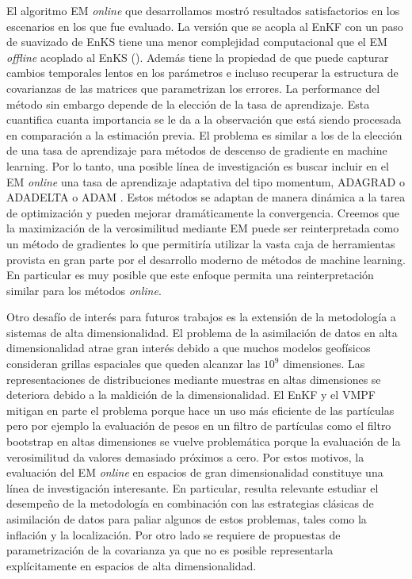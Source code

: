 El algoritmo EM \textit{online} que desarrollamos mostró resultados satisfactorios en los escenarios en los que fue evaluado. La versión que se acopla al EnKF con un paso de suavizado de EnKS tiene una menor complejidad computacional que el EM \textit{offline} acoplado al EnKS (\cite{Pulido2018}). Además tiene la propiedad de que puede capturar cambios temporales lentos en los parámetros e incluso recuperar la estructura de covarianzas de las matrices que parametrizan los errores. La performance del método sin embargo depende de la elección de la tasa de aprendizaje. Esta cuantifica cuanta importancia se le da a la observación que está siendo procesada en comparación a la estimación previa. El problema es similar a los de la elección de una tasa de aprendizaje para métodos de descenso de gradiente en machine learning. Por lo tanto, una posible línea de investigación es buscar incluir en el EM \textit{online} una tasa de aprendizaje adaptativa del tipo momentum, ADAGRAD o ADADELTA \citep{Zeiler2012} o ADAM \citep{Kingma2014}. Estos métodos se adaptan de manera dinámica a la tarea de optimización y pueden mejorar dramáticamente la convergencia. Creemos que la maximización de la verosimilitud mediante EM puede ser reinterpretada como un método de gradientes lo que permitiría utilizar la vasta caja de herramientas provista en gran parte por el desarrollo moderno de métodos de machine learning. En particular es muy posible que este enfoque permita una reinterpretación similar para los métodos \textit{online}.

Otro desafío de interés para futuros trabajos es la extensión de la metodología a sistemas de alta dimensionalidad. El problema de la asimilación de datos en alta dimensionalidad atrae gran interés debido a que muchos modelos geofísicos consideran grillas espaciales que queden alcanzar las $10^9$ dimensiones. Las representaciones de distribuciones mediante muestras en altas dimensiones se deteriora debido a la maldición de la dimensionalidad. El EnKF y el VMPF mitigan en parte el problema porque hace un uso más eficiente de las partículas pero por ejemplo la evaluación de pesos en un filtro de partículas como el filtro bootstrap en altas dimensiones se vuelve problemática porque la evaluación de la verosimilitud da valores demasiado próximos a cero. Por estos motivos, la evaluación del EM \textit{online} en espacios de gran dimensionalidad constituye una línea de investigación interesante. En particular, resulta relevante estudiar el desempeño de la metodología en combinación con las estrategias clásicas de asimilación de datos para paliar algunos de estos problemas, tales como la inflación y la localización. Por otro lado se requiere de propuestas de parametrización de la covarianza ya que no es posible representarla explícitamente en espacios de alta dimensionalidad.

